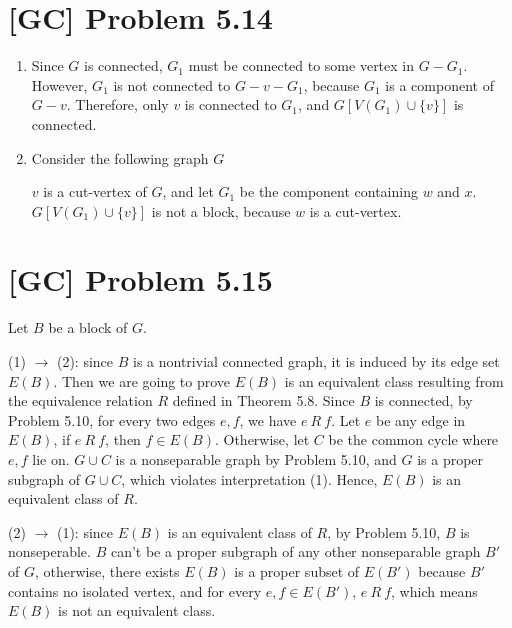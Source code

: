 \documentclass[a4paper,11pt,twocolumn]{article}
\begin{document}
  \section{[GC] Problem 5.14}
  \begin{enumerate}
  	\item Since $G$ is connected, $G_1$ must be connected to some vertex in $G-G_1$. However, $G_1$ is not connected to $G-v-G_1$, because $G_1$ is a component of $G-v$. Therefore, only $v$ is connected to $G_1$, and $G[V(G_1) \cup \{v\}]$ is connected.
  	\item Consider the following graph $G$
  	\small
    \begin{center}
    \end{center} \par
    \normalsize
    $v$ is a cut-vertex of $G$, and let $G_1$ be the component containing $w$ and $x$. $G[V(G_1) \cup \{v\}]$ is not a block, because $w$ is a cut-vertex.
  \end{enumerate}

  \section{[GC] Problem 5.15}
  Let $B$ be a block of $G$. \par
  (1) $\rightarrow$ (2): since $B$ is a nontrivial connected graph, it is induced by its edge set $E(B)$. Then we are going to prove $E(B)$ is an equivalent class resulting from the equivalence relation $R$ defined in Theorem 5.8. Since $B$ is connected, by Problem 5.10, for every two edges $e, f$, we have $e~R~f$. Let $e$ be any edge in $E(B)$, if $e~R~f$, then $f \in E(B)$. Otherwise, let $C$ be the common cycle where $e, f$ lie on. $G \cup C$ is a nonseparable graph by Problem 5.10,  and $G$ is a proper subgraph of $G \cup C$, which violates interpretation (1). Hence, $E(B)$ is an equivalent class of $R$. \par
  (2) $\rightarrow$ (1): since $E(B)$ is an equivalent class of $R$, by Problem 5.10, $B$ is nonseperable. $B$ can't be a proper subgraph of any other nonseparable graph $B'$ of $G$, otherwise, there exists $E(B)$ is a proper subset of $E(B')$ because $B'$ contains no isolated vertex, and for every $e, f \in E(B')$, $e~R~f$, which means $E(B)$ is not an equivalent class.
\end{document}

